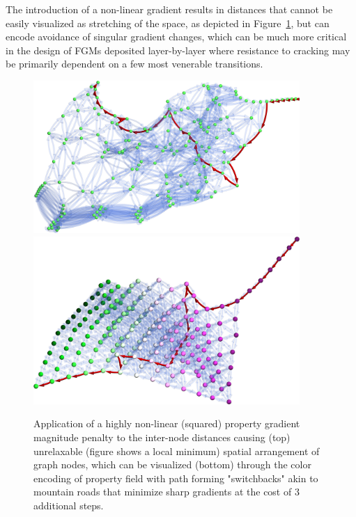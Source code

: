 The introduction of a non-linear gradient results in distances that cannot be easily visualized as stretching of the space, as depicted in Figure~\ref{pathplan:fig:lowgradientsquared}, but can encode avoidance of singular gradient changes, which can be much more critical in the design of FGMs deposited layer-by-layer where resistance to cracking may be primarily dependent on a few most venerable transitions.

\begin{figure}[H]
    \centering
    \includegraphics[width=0.9\textwidth]{pathplanning/InfeasibilityGliding_LowGradientSquared.jpeg}
    \includegraphics[width=0.9\textwidth]{pathplanning/InfeasibilityGliding_LowGradientSquaredColored.jpeg}
    \caption{Application of a highly non-linear (squared) property gradient magnitude penalty to the inter-node distances causing (top) unrelaxable (figure shows a local minimum) spatial arrangement of graph nodes, which can be visualized (bottom) through the color encoding of property field with path forming "switchbacks" akin to mountain roads that minimize sharp gradients at the cost of 3 additional steps.}
    \label{pathplan:fig:lowgradientsquared}
\end{figure}

